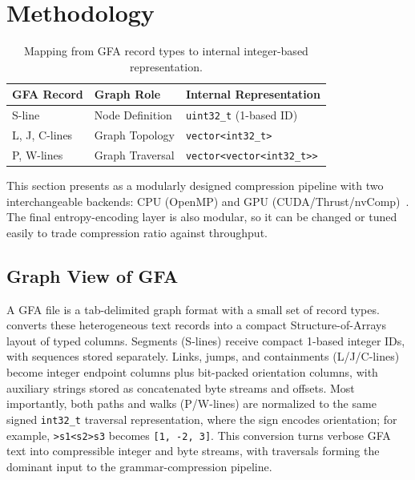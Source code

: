 \section{Methodology}\label{sec:methodology}

\begin{table}[t]
  \caption{Mapping from GFA record types to \gfaz internal integer-based representation.}
  \label{tab:data-mapping}
  \small
  \begin{tabular}{lll}
    \hline
    \textbf{GFA Record} & \textbf{Graph Role} & \textbf{Internal Representation}    \\
    \hline
    S-line              & Node Definition     & \texttt{uint32\_t} (1-based ID)     \\
    L, J, C-lines       & Graph Topology      & \texttt{vector<int32\_t>{}}         \\
    P, W-lines          & Graph Traversal     & \texttt{vector<vector<int32\_t>{}>} \\
    \hline
  \end{tabular}
\end{table}

This section presents \gfaz as a modularly designed compression pipeline with two interchangeable backends: CPU (OpenMP) and GPU (CUDA/Thrust/nvComp)~\cite{nvcomp_github}. The final entropy-encoding layer is also modular, so it can be changed or tuned easily to trade compression ratio against throughput.


\subsection{Graph View of GFA}\label{subsec:graph-view}

A GFA file is a tab-delimited graph format with a small set of record types. \gfaz converts these heterogeneous text records into a compact Structure-of-Arrays layout of typed columns. Segments (S-lines) receive compact 1-based integer IDs, with sequences stored separately. Links, jumps, and containments (L/J/C-lines) become integer endpoint columns plus bit-packed orientation columns, with auxiliary strings stored as concatenated byte streams and offsets. Most importantly, both paths and walks (P/W-lines) are normalized to the same signed \texttt{int32\_t} traversal representation, where the sign encodes orientation; for example, \texttt{>s1<s2>s3} becomes \texttt{[1, -2, 3]}. This conversion turns verbose GFA text into compressible integer and byte streams, with traversals forming the dominant input to the grammar-compression pipeline.


